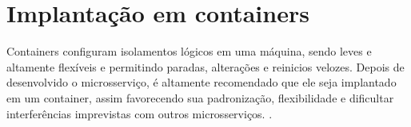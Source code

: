



\section{Implantação em containers}

Containers configuram isolamentos lógicos em uma máquina, sendo leves e altamente flexíveis e permitindo paradas, alterações e reinicios velozes. Depois de desenvolvido o microsserviço, é altamente recomendado que ele seja implantado em um container, assim favorecendo sua padronização, flexibilidade e dificultar interferências imprevistas com outros microsserviços. \cite{oracle_microservices}.


